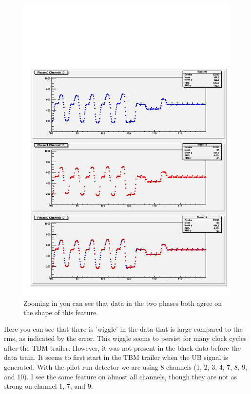 \begin{figure}
\begin{center}
\includegraphics[width=\linewidth]{phaseAndDelayPlot_channe_10_1_latedatazoom}
\end{center}
\caption{Zooming in you can see that data in the two phases both agree on the shape of this feature. }
\label{fig:phasedelaylatedatazoom}
\end{figure}

Here you can see that there is 'wiggle' in the data that is large compared to the rms, as indicated by the error. This wiggle seems to persist for many clock cycles after the TBM trailer. However, it was not present in the black data before the data train. It seems to first start in the TBM trailer when the UB signal is generated. With the pilot run detector we are using 8 channels  (1, 2, 3, 4, 7, 8, 9, and 10). I see the same feature on  almost all channels, though they are not as strong on channel 1, 7, and 9. 

